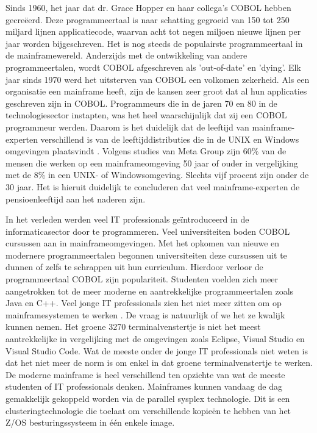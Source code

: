 Sinds 1960, het jaar dat dr. Grace Hopper en haar collega's COBOL hebben gecreëerd. Deze programmeertaal is naar schatting gegroeid van 150 tot 250 miljard lijnen applicatiecode, waarvan acht tot negen miljoen nieuwe lijnen per jaar worden bijgeschreven. Het is nog steeds de populairste programmeertaal in de mainframewereld. Anderzijds met de ontwikkeling van andere programmeertalen, wordt COBOL afgeschreven als 'out-of-date' en 'dying'. Elk jaar sinds 1970 werd het uitsterven van COBOL een volkomen zekerheid. Als een organisatie een mainframe heeft, zijn de kansen zeer groot dat al hun applicaties geschreven zijn in COBOL. Programmeurs die in de jaren 70 en 80 in de technologiesector instapten, was het heel waarschijnlijk dat zij een COBOL programmeur werden. Daarom is het duidelijk dat de leeftijd van mainframe-experten verschillend is van de leeftijddistributies die in de UNIX en Windows omgevingen plaatsvindt \autocite{McGirr}. Volgens studies van Meta Group zijn 60\% van de mensen die werken op een mainframeomgeving  50 jaar of ouder in vergelijking met de 8\% in een UNIX- of Windowsomgeving. Slechts vijf procent zijn onder de 30 jaar. Het is hieruit duidelijk te concluderen dat veel mainframe-experten de pensioenleeftijd aan het naderen zijn. 

In het verleden werden veel IT professionals geïntroduceerd in de informaticasector door te programmeren. Veel universiteiten boden COBOL cursussen aan in mainframeomgevingen. Met het opkomen van nieuwe en modernere programmeertalen begonnen universiteiten deze cursussen uit te dunnen of zelfs te schrappen uit hun curriculum. Hierdoor verloor de programmeertaal COBOL zijn populariteit. Studenten voelden zich meer aangetrokken tot de meer moderne en aantrekkelijke programmeertalen zoals Java en C++. Veel jonge IT professionals zien het niet meer zitten om op mainframesystemen te werken \autocite{Mullins2016}. De vraag is natuurlijk of we het ze kwalijk kunnen nemen. Het groene 3270 terminalvenstertje is niet het meest aantrekkelijke in vergelijking met de omgevingen zoals Eclipse, Visual Studio en Visual Studio Code. Wat de meeste onder de jonge IT professionals niet weten is dat het niet meer de norm is om enkel in dat groene terminalvenstertje te werken. De moderne mainframe is heel verschillend ten opzichte van wat de meeste studenten of IT professionals denken. Mainframes kunnen vandaag de dag gemakkelijk gekoppeld worden via de parallel sysplex technologie. Dit is een clusteringtechnologie die toelaat om verschillende kopieën te hebben van het Z/OS besturingssysteem in één enkele image. 

